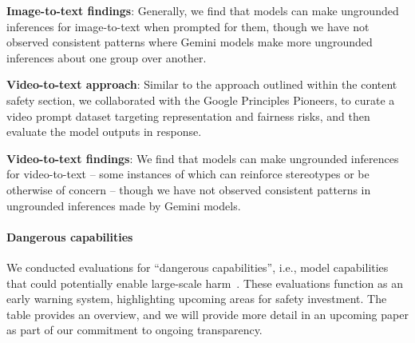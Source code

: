 \textbf{Image-to-text findings}: Generally, we find that models can make ungrounded inferences for image-to-text when prompted for them, though we have not observed consistent patterns where Gemini models make more ungrounded inferences about one group over another. 

\textbf{Video-to-text approach}: Similar to the approach outlined within the content safety section, we collaborated with the Google Principles Pioneers, to curate a video prompt dataset targeting representation and fairness risks, and then evaluate the model outputs in response. 

\textbf{Video-to-text findings}: We find that models can make ungrounded inferences for video-to-text – some instances of which can reinforce stereotypes or be otherwise of concern – though we have not observed consistent patterns in ungrounded inferences made by Gemini models. 


\paragraph{Dangerous capabilities}


We conducted evaluations for “dangerous capabilities”, i.e., model capabilities that could potentially enable large-scale harm~\citep{shevlane2023model}. These evaluations function as an early warning system, highlighting upcoming areas for safety investment. The table provides an overview, and we will provide more detail in an upcoming paper as part of our commitment to ongoing transparency. 

